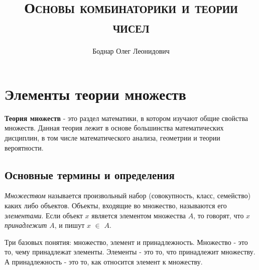 

\setmainfont{Times New Roman}

\title{\textbf{\textsc{Основы комбинаторики и теории чисел}}}
\author{Боднар Олег Леонидович}
\date{} %
\linespread{1.3} %

\hypersetup{hidelinks} %

\pagestyle{fancy} %
\fancyhf{}
\rhead{\thepage} %
\renewcommand{\headrulewidth}{1pt} %


	
	\maketitle %
	\thispagestyle{empty} %
	\clearpage %
	\setcounter{page}{1} %
	\thispagestyle{empty}
	\tableofcontents\label{sec:toc}
	\clearpage

	\section{Элементы теории множеств}
	
	\textbf{Теория множеств} - это раздел математики, в котором изучают общие свойства множеств. Данная теория лежит в основе большинства математических дисциплин, в том числе математического анализа, геометрии и теории вероятности.
	
	\subsection{Основные термины и определения}
	
	\begin{definition}
	\textit{Множеством} называется произвольный набор (совокупность, класс, семейство) каких либо объектов. Объекты, входящие во множество, называются его \textit{элементами}. Если объект $x$ является элементом множества $A$, то говорят, что $x$ \textit{принадлежит} $A$, и пишут $x$ $\in$ $A$.
	\end{definition}
	
	Три базовых понятия: множество, элемент и принадлежность. Множество - это то, чему принадлежат элементы.  Элементы - это то, что принадлежит множеству. А принадлежность - это то, как относится элемент к множеству. 

